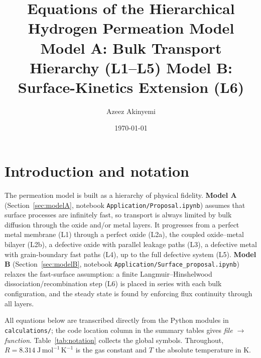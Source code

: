 \documentclass[11pt,a4paper]{article}
\title{Equations of the Hierarchical Hydrogen Permeation Model\\
\large Model A: Bulk Transport Hierarchy (L1--L5) \quad
Model B: Surface-Kinetics Extension (L6)}
\author{Azeez Akinyemi}
\date{\today}
\newcommand{\code}[1]{\texttt{#1}}
\begin{document}
\maketitle
\tableofcontents
\clearpage

\section{Introduction and notation}

The permeation model is built as a hierarchy of physical fidelity. \textbf{Model
A} (Section~\ref{sec:modelA}, notebook \code{Application/Proposal.ipynb})
assumes that surface processes are infinitely fast, so transport is always
limited by bulk diffusion through the oxide and/or metal layers. It progresses
from a perfect metal membrane (L1) through a perfect oxide (L2a), the coupled
oxide--metal bilayer (L2b), a defective oxide with parallel leakage paths (L3),
a defective metal with grain-boundary fast paths (L4), up to the
full defective system (L5). \textbf{Model B} (Section~\ref{sec:modelB},
notebook \code{Application/Surface\_proposal.ipynb}) relaxes the fast-surface
assumption: a finite Langmuir--Hinshelwood dissociation/recombination step (L6)
is placed in series with each bulk configuration, and the steady state is found
by enforcing flux continuity through all layers.

All equations below are transcribed directly from the Python modules in
\code{calculations/}; the code location column in the summary tables gives
\emph{file $\rightarrow$ function}. Table~\ref{tab:notation} collects the
global symbols. Throughout, $R = 8.314\;\mathrm{J\,mol^{-1}\,K^{-1}}$ is the
gas constant and $T$ the absolute temperature in K.
\end{document}
